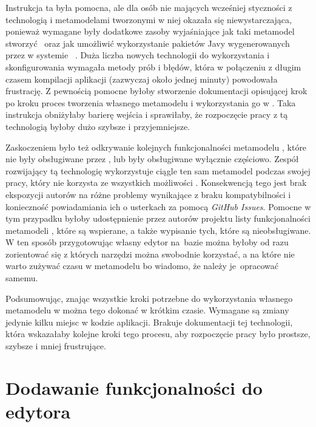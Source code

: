 Instrukcja ta była pomocna, ale dla osób nie mających wcześniej styczności z
technologią \EMF{} i metamodelami tworzonymi w niej okazała się
niewystarczająca, ponieważ wymagane były dodatkowe zasoby wyjaśniające jak taki
metamodel stworzyć~\cite{dokumentacja-sirius-desktop,dokumentacja-aql} oraz jak
umożliwić wykorzystanie pakietów Javy wygenerowanych przez \EMF{} w systemie
\Maven{}~\cite{maven-tycho-tutorial}.
Duża liczba nowych technologii do wykorzystania i skonfigurowania wymagała
metody prób i błędów, która w połączeniu z długim czasem kompilacji aplikacji
(zazwyczaj około jednej minuty) powodowała frustrację. Z pewnością pomocne
byłoby
stworzenie dokumentacji opisującej krok po kroku proces tworzenia własnego
metamodelu i wykorzystania go w \SiriusWeb{}. Taka instrukcja obniżyłaby
barierę wejścia i sprawiłaby, że rozpoczęcie pracy z tą technologią byłoby dużo
szybsze i przyjemniejsze.

Zaskoczeniem było też odkrywanie kolejnych funkcjonalności metamodelu
\EMF{}, które nie były obsługiwane przez \SiriusWeb{}, lub były
obsługiwane wyłącznie częściowo. Zespół rozwijający tą technologię wykorzystuje
ciągle ten sam metamodel podczas swojej pracy, który nie korzysta ze
wszystkich możliwości \EMF{}. Konsekwencją tego jest brak ekspozycji autorów
\SiriusWeb{} na różne problemy wynikające z braku kompatybilności i
konieczność powiadamiania ich o usterkach za pomocą \emph{GitHub Issues}.
Pomocne w tym przypadku byłoby udostępnienie przez autorów projektu listy
funkcjonalności metamodeli \EMF{}, które są wspierane, a także wypisanie
tych, które są nieobsługiwane. W ten sposób przygotowując własny edytor
na~bazie
\SiriusWeb{} można byłoby od razu zorientować się z których narzędzi można
swobodnie korzystać, a na które nie warto zużywać czasu w metamodelu \EMF{}
bo wiadomo, że należy je~opracować samemu.

Podsumowując, znając wszystkie kroki potrzebne do wykorzystania własnego
metamodelu \EMF{} w \SiriusWeb{} można tego dokonać w krótkim czasie.
Wymagane są zmiany jedynie kilku miejsc w kodzie aplikacji. Brakuje
dokumentacji tej technologii, która wskazałaby kolejne kroki tego
procesu, aby rozpoczęcie pracy było prostsze, szybsze i mniej frustrujące.

\section{Dodawanie funkcjonalności do edytora}


